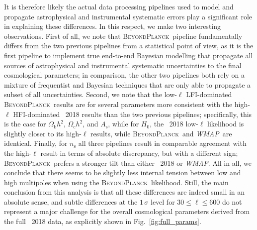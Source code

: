 \documentclass[twocolumn]{aa}
\def\WMAP{\textit{WMAP}}
\newcommand{\BP}{\textsc{BeyondPlanck}}
\begin{document}
It is therefore likely the actual data processing pipelines used to
model and propagate astrophysical and instrumental systematic errors
play a significant role in explaining these differences. In this
respect, we make two interesting observations. First of all, we note
that \BP\ pipeline fundamentally differs from the two previous
pipelines from a statistical point of view, as it is the first
pipeline to implement true end-to-end Bayesian modelling that
propagate all sources of astrophysical and instrumental systematic
uncertainties to the final cosmological parameters; in comparison, the
other two pipelines both rely on a mixture of frequentist and Bayesian
techniques that are only able to propagate a subset of all
uncertainties. Second, we note that the low-$\ell$ LFI-dominated
\BP\ results are for several parameters more consistent with the
high-$\ell$ HFI-dominated \Planck\ 2018 results than the two previous
pipelines; specifically, this is the case for $\Omega_\mathrm{b}h^2$,
$\Omega_\mathrm{c}h^2$, and $A_{\mathrm{s}}$, while for $H_0$, the
\Planck\ 2018 low-$\ell$ likelihood is slightly closer to its
high-$\ell$ results, while \BP\ and \WMAP\ are identical. Finally, for
$n_\mathrm{s}$ all three pipelines result in comparable agreement with
the high-$\ell$ result in terms of absolute discrepancy, but with a
different sign; \BP\ prefers a stronger tilt than either \Planck\ 2018
or \WMAP. All in all, we conclude that there seems to be slightly less
internal tension between low and high multipoles when using the
\BP\ likelihood. Still, the main conclusion from this analysis is that
all these differences are indeed small in an absolute sense, and
subtle differences at the $1\,\sigma$ level for $30\le\ell\le 600$ do
not represent a major challenge for the overall cosmological
parameters derived from the full \Planck\ 2018 data, as explicitly
shown in Fig.~\ref{fig:full_params}.
\end{document}
